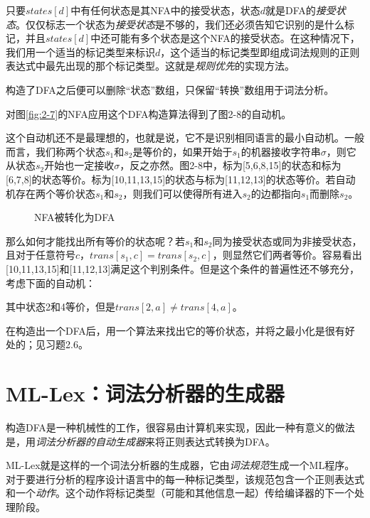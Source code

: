 \documentclass[cn,11pt,chinese]{elegantbook}
\begin{document}
只要$states[d]$中有任何状态是其NFA中的接受状态，状态$d$就是DFA的\textit{接受状态}。仅仅标志一个状态为\textit{接受状态}是不够的，我们还必须告知它识别的是什么标记，并且$states[d]$中还可能有多个状态是这个NFA的接受状态。在这种情况下，我们用一个适当的标记类型来标识$d$，这个适当的标记类型即组成词法规则的正则表达式中最先出现的那个标记类型。这就是\textit{规则优先}的实现方法。

构造了DFA之后便可以删除“状态”数组，只保留“转换”数组用于词法分析。

对图\ref{fig:2-7}的NFA应用这个DFA构造算法得到了图2-8的自动机。

这个自动机还不是最理想的，也就是说，它不是识别相同语言的最小自动机。一般而言，我们称两个状态$s_1$和$s_2$是等价的，如果开始于$s_1$的机器接收字符串$\sigma$，则它从状态$s_2$开始也一定接收$\sigma$，反之亦然。图2-8中，标为[5,6,8,15]的状态和标为[6,7,8]的状态等价。标为[10,11,13,15]的状态与标为[11,12,13]的状态等价。若自动机存在两个等价状态$s_1$和$s_2$，则我们可以使得所有进入$s_2$的边都指向$s_1$而删除$s_2$。

\begin{figure}[htbp]
  \centering
  \begin{tikzpicture}
    
  \end{tikzpicture}
  \caption{NFA被转化为DFA}
  \label{fig:2-8}
\end{figure}

那么如何才能找出所有等价的状态呢？若$s_1$和$s_2$同为接受状态或同为非接受状态，且对于任意符号$c$，$trans[s_1,c]=trans[s_2,c]$，则显然它们两者等价。容易看出[10,11,13,15]和[11,12,13]满足这个判别条件。但是这个条件的普遍性还不够充分，考虑下面的自动机：

其中状态2和4等价，但是$trans[2,a] \neq trans[4,a]$。

在构造出一个DFA后，用一个算法来找出它的等价状态，并将之最小化是很有好处的；见习题2.6。

\section{ML-Lex：词法分析器的生成器}

构造DFA是一种机械性的工作，很容易由计算机来实现，因此一种有意义的做法是，用\textit{词法分析器的自动生成器}来将正则表达式转换为DFA。

ML-Lex就是这样的一个词法分析器的生成器，它由\textit{词法规范}生成一个ML程序。对于要进行分析的程序设计语言中的每一种标记类型，该规范包含一个正则表达式和一个\textit{动作}。这个动作将标记类型（可能和其他信息一起）传给编译器的下一个处理阶段。
\end{document}
